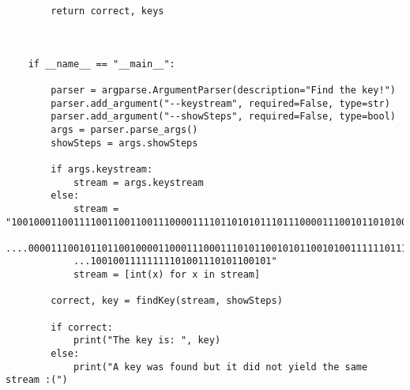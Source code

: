 \documentclass{article}
\begin{document}
\begin{verbatim}
        return correct, keys
    
    
    
    if __name__ == "__main__":
    
        parser = argparse.ArgumentParser(description="Find the key!")
        parser.add_argument("--keystream", required=False, type=str)
        parser.add_argument("--showSteps", required=False, type=bool)
        args = parser.parse_args()
        showSteps = args.showSteps
    
        if args.keystream:
            stream = args.keystream
        else:
            stream = "100100011001111001100110011100001111011010101110111000011100101101010001011000...
            ....00001110010110110010000110001110001110101100101011001010011111101111110000100010111...
            ...10010011111111101001110101100101"
            stream = [int(x) for x in stream]
        
        correct, key = findKey(stream, showSteps)
        
        if correct:
            print("The key is: ", key)
        else:
            print("A key was found but it did not yield the same stream :(")
\end{verbatim}
\end{document}
